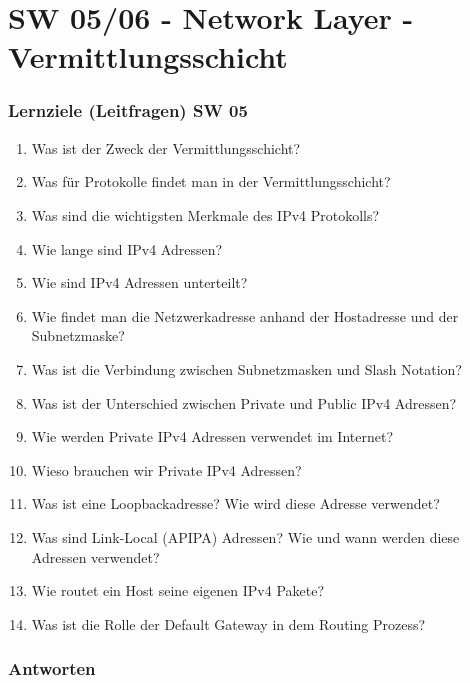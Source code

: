 \part{SW 05/06 - Network Layer - Vermittlungsschicht}\label{part:sw0506}
\section{Lernziele (Leitfragen) SW 05}
\begin{enumerate}
    \item Was ist der Zweck der Vermittlungsschicht?
    \item Was für Protokolle findet man in der Vermittlungsschicht?
    \item Was sind die wichtigsten Merkmale des IPv4 Protokolls?
    \item Wie lange sind IPv4 Adressen?
    \item Wie sind IPv4 Adressen unterteilt?
    \item Wie findet man die Netzwerkadresse anhand der Hostadresse und der Subnetzmaske?
    \item Was ist die Verbindung zwischen Subnetzmasken und \flqq Slash Notation\frqq{}?
    \item Was ist der Unterschied zwischen Private und Public IPv4 Adressen?
    \item Wie werden Private IPv4 Adressen verwendet im Internet?
    \item Wieso brauchen wir Private IPv4 Adressen?
    \item Was ist eine Loopbackadresse? Wie wird diese Adresse verwendet?
    \item Was sind \flqq Link-Local\frqq{} (APIPA) Adressen? Wie und wann werden diese Adressen verwendet?
    \item Wie routet ein Host seine eigenen IPv4 Pakete?
    \item Was ist die Rolle der Default Gateway in dem Routing Prozess?
\end{enumerate}

\section{Antworten}
